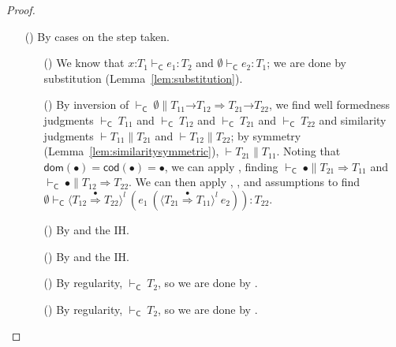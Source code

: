 \documentclass[9pt]{extarticle}
\newcommand{\ottnt}[1]{\mathit{#1}}
\begin{document}
\begin{lemma}
\begin{proof}
{\begin{itemize}
    \item[(\T{App})] By cases on the step taken.
\begin{itemize}
      \item[(\E{Beta})] We know that $  \mathit{x} \mathord{:} \ottnt{T_{{\mathrm{1}}}}    \vdash _{  \mathsf{C}  }  \ottnt{e_{{\mathrm{1}}}}  :  \ottnt{T_{{\mathrm{2}}}} $ and
        $ \emptyset   \vdash _{  \mathsf{C}  }  \ottnt{e_{{\mathrm{2}}}}  :  \ottnt{T_{{\mathrm{1}}}} $; we are done by substitution
        (Lemma~\ref{lem:substitution}).
      \item[(\E{Unwrap})] By inversion of $ \mathord{  \vdash _{  \mathsf{C}  } }~ \emptyset   \mathrel{\parallel}    \ottnt{T_{{\mathrm{11}}}} \mathord{ \rightarrow } \ottnt{T_{{\mathrm{12}}}}   \Rightarrow   \ottnt{T_{{\mathrm{21}}}} \mathord{ \rightarrow } \ottnt{T_{{\mathrm{22}}}}  $, we find well formedness judgments $ \mathord{  \vdash _{  \mathsf{C}  } }~ \ottnt{T_{{\mathrm{11}}}} $
        and $ \mathord{  \vdash _{  \mathsf{C}  } }~ \ottnt{T_{{\mathrm{12}}}} $ and $ \mathord{  \vdash _{  \mathsf{C}  } }~ \ottnt{T_{{\mathrm{21}}}} $ and $ \mathord{  \vdash _{  \mathsf{C}  } }~ \ottnt{T_{{\mathrm{22}}}} $ and
        similarity judgments $\vdash  \ottnt{T_{{\mathrm{11}}}}  \mathrel{\parallel}  \ottnt{T_{{\mathrm{21}}}}$ and $\vdash  \ottnt{T_{{\mathrm{12}}}}  \mathrel{\parallel}  \ottnt{T_{{\mathrm{22}}}}$; by symmetry (Lemma~\ref{lem:similaritysymmetric}),
        $\vdash  \ottnt{T_{{\mathrm{21}}}}  \mathrel{\parallel}  \ottnt{T_{{\mathrm{11}}}}$. Noting that $ \mathsf{dom} ( \bullet )  =  \mathsf{cod} ( \bullet )  =
         \bullet $, we can apply , finding $ \mathord{  \vdash _{  \mathsf{C}  } }~ \bullet   \mathrel{\parallel}   \ottnt{T_{{\mathrm{21}}}}  \Rightarrow  \ottnt{T_{{\mathrm{11}}}} $ and $ \mathord{  \vdash _{  \mathsf{C}  } }~ \bullet   \mathrel{\parallel}   \ottnt{T_{{\mathrm{12}}}}  \Rightarrow  \ottnt{T_{{\mathrm{22}}}} $. We can then
        apply , , and assumptions to find $ \emptyset   \vdash _{  \mathsf{C}  }   \langle  \ottnt{T_{{\mathrm{12}}}}  \mathord{ \overset{\bullet}{\Rightarrow} }  \ottnt{T_{{\mathrm{22}}}}  \rangle^{ \ottnt{l} } ~   (  \ottnt{e_{{\mathrm{1}}}} ~  (  \langle  \ottnt{T_{{\mathrm{21}}}}  \mathord{ \overset{\bullet}{\Rightarrow} }  \ottnt{T_{{\mathrm{11}}}}  \rangle^{ \ottnt{l} } ~  \ottnt{e_{{\mathrm{2}}}}  )   )    :  \ottnt{T_{{\mathrm{22}}}} $.
      \item[(\E{AppL})] By  and the IH.
      \item[(\E{AppR})] By  and the IH.
      \item[(\E{AppRaiseL})] By regularity, $ \mathord{  \vdash _{  \mathsf{C}  } }~ \ottnt{T_{{\mathrm{2}}}} $, so we are
        done by .
      \item[(\E{AppRaiseR})] By regularity, $ \mathord{  \vdash _{  \mathsf{C}  } }~ \ottnt{T_{{\mathrm{2}}}} $, so we are
        done by .
      \end{itemize}


\end{itemize}}
\end{proof}
\end{lemma}
\end{document}
